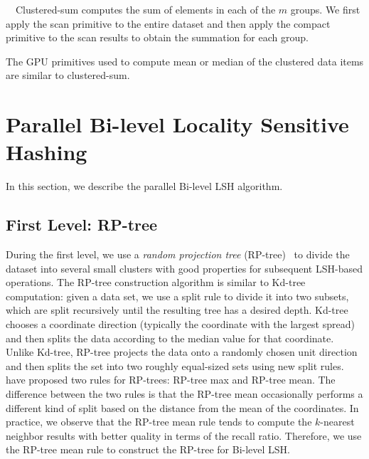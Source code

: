  \ \ Clustered-sum computes the sum of elements in each of the $m$ groups. We first apply the scan primitive to the entire dataset and then apply the compact primitive to the scan results to obtain the summation for each group.

\vspace{15px}
\noindent {}
\vspace{15px}

The GPU primitives used to compute mean or median of the clustered data items are similar to clustered-sum.


\section{Parallel Bi-level Locality Sensitive Hashing}
\label{sec:6:parallel}
In this section, we describe the parallel Bi-level LSH algorithm.

\subsection{First Level: RP-tree}
During the first level, we use a \emph{random projection tree} (RP-tree)~\cite{yoav:nips:2007,Dasgupta:2008} to divide the dataset into several small clusters with good properties for subsequent LSH-based operations. The RP-tree construction algorithm is similar to Kd-tree computation: given a data set, we use a split rule to divide it into two subsets, which are split recursively until the resulting tree has a desired depth. Kd-tree chooses a coordinate direction (typically the coordinate with the largest spread) and then splits the data according to the median value for that coordinate. Unlike Kd-tree, RP-tree projects the data onto a randomly chosen unit direction and then splits the set into two roughly equal-sized sets using new split rules. \cite{Dasgupta:2008} have proposed two rules for RP-trees: RP-tree max and RP-tree mean. The difference between the two rules is that the RP-tree mean occasionally performs a different kind of split based on the distance from the mean of the coordinates. In practice, we observe that the RP-tree mean rule tends to compute the $k$-nearest neighbor results with better quality in terms of the recall ratio. Therefore, we use the RP-tree mean rule to construct the RP-tree for Bi-level LSH.

